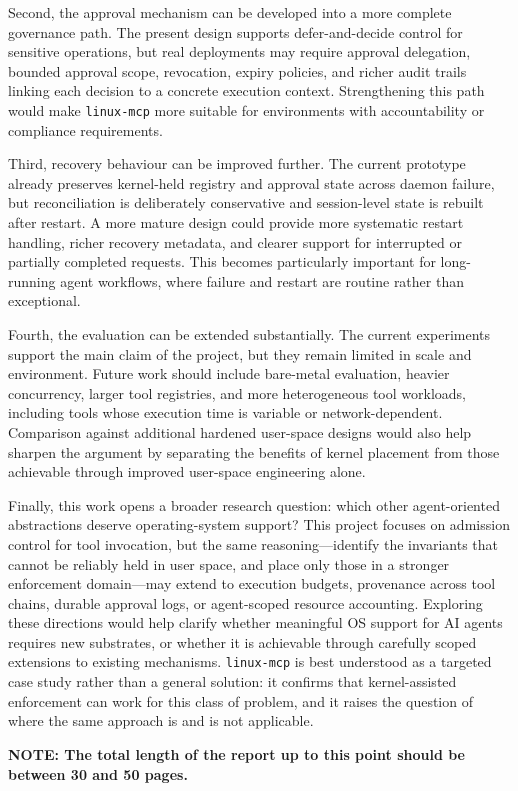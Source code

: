 Second, the approval mechanism can be developed into a more complete governance path. 
The present design supports defer-and-decide control for sensitive operations, but real deployments may require approval delegation, bounded approval scope, revocation, expiry policies, and richer audit trails linking each decision to a concrete execution context. 
Strengthening this path would make \texttt{linux-mcp} more suitable for environments with accountability or compliance requirements.

Third, recovery behaviour can be improved further. The current prototype already preserves kernel-held registry and approval state across daemon failure, but reconciliation is deliberately conservative and session-level state is rebuilt after restart. 
A more mature design could provide more systematic restart handling, richer recovery metadata, and clearer support for interrupted or partially completed requests.
This becomes particularly important for long-running agent workflows, where failure and restart are routine rather than exceptional.

Fourth, the evaluation can be extended substantially. The current experiments
support the main claim of the project, but they remain limited in scale and
environment. Future work should include bare-metal evaluation, heavier concurrency, larger tool registries, and more heterogeneous tool workloads, including tools whose execution time is variable or network-dependent.
Comparison against additional hardened user-space designs would also help sharpen the argument by separating the benefits of kernel placement from those achievable through improved user-space engineering alone.

Finally, this work opens a broader research question: which other agent-oriented abstractions deserve operating-system support?
This project focuses on admission control for tool invocation, but the same reasoning---identify the invariants that cannot be reliably held in user space, and place only those in a stronger enforcement domain---may extend to execution budgets, provenance across tool chains, durable approval logs, or agent-scoped resource accounting.
Exploring these directions would help clarify whether meaningful OS support for AI agents requires new substrates, or whether it is achievable through carefully scoped extensions to existing mechanisms.
\texttt{linux-mcp} is best understood as a targeted case study rather than a general solution: it confirms that kernel-assisted enforcement can work for this class of problem, and it raises the question of where the same approach is and is not applicable.

\vspace{\baselineskip}
\noindent\textbf{NOTE: The total length of the report up to this point should be between 30 and 50 pages.}